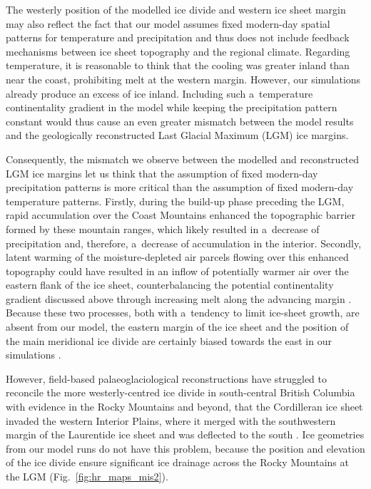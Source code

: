 \documentclass[tc, manuscript]{copernicus}
\begin{document}
      The westerly position of the modelled ice divide and western ice sheet
      margin may also reflect the fact that our model assumes fixed
      modern-day spatial patterns for temperature and precipitation and thus
      does not include feedback mechanisms between ice sheet topography and
      the regional climate. Regarding temperature, it is reasonable to think
      that the cooling was greater inland than near the coast, prohibiting
      melt at the western margin. However, our simulations already produce
      an excess of ice inland. Including such a~temperature continentality
      gradient in the model while keeping the precipitation pattern constant
      would thus cause an even greater mismatch between the model results
      and the geologically reconstructed Last Glacial Maximum (LGM) ice
      margins.

      Consequently, the mismatch we observe between the modelled and
      reconstructed LGM ice margins let us think that the assumption of
      fixed modern-day precipitation patterns is more critical than the
      assumption of fixed modern-day temperature patterns.
      Firstly, during the build-up
      phase preceding the LGM, rapid accumulation over the Coast Mountains
      enhanced the topographic barrier formed by these mountain ranges,
      which likely resulted in a~decrease of precipitation and, therefore,
      a~decrease of accumulation in the interior. Secondly, latent warming
      of the moisture-depleted air parcels flowing over this enhanced
      topography could have resulted in an inflow of potentially warmer air
      over the eastern flank of the ice sheet, counterbalancing the potential
      continentality gradient discussed above through increasing melt along the
      advancing margin \citep[cf.][]{Langen.etal.2012}. Because these two
      processes, both with a~tendency to limit ice-sheet growth, are absent
      from our model, the eastern margin of the ice sheet and the position
      of the main meridional ice divide are certainly biased towards the
      east in our simulations \citep{Seguinot.etal.2014}.

      However, field-based palaeoglaciological reconstructions have
      struggled to reconcile the more westerly-centred ice divide in
      south-central British Columbia with evidence in the Rocky Mountains
      and beyond, that the Cordilleran ice sheet invaded the western
      Interior Plains, where it merged with the southwestern margin of the
      Laurentide ice sheet and was deflected to the south
      \citep{Jackson.etal.1997, Bednarski.Smith.2007, Kleman.etal.2010,
      Margold.etal.2013, Margold.etal.2013a}. Ice geometries from our model
      runs do not have this problem, because the position and elevation of
      the ice divide ensure significant ice drainage across the Rocky
      Mountains at the LGM (Fig.~\ref{fig:hr_maps_mis2}).
\end{document}

